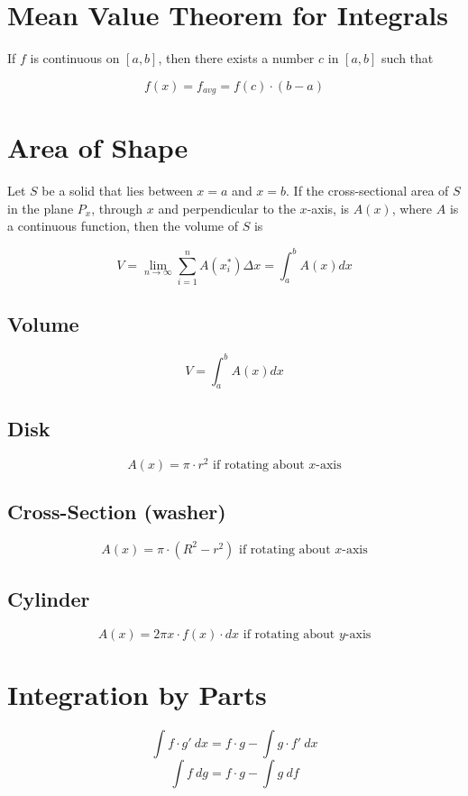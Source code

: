 \documentclass[12pt]{article}
\begin{document}
\section{Mean Value Theorem for Integrals} If $f$ is continuous on $[a,b]$, then there exists a number $c$ in $[a,b]$ such that 

$$f(x) = f_{avg} = f(c) \cdot (b-a)$$


\section{Area of Shape} Let $S$ be a solid that lies between $x=a$ and $x=b$. If the cross-sectional area of $S$ in the plane $P_x$, through $x$ and perpendicular to the $x$-axis, is $A(x)$, where $A$ is a continuous function, then the volume of $S$ is 

$$V=\lim_{n \to \infty} \sum_{i=1}^{n} A(x_i^*) \Delta x = \int_a^b A(x) dx$$

\subsection{Volume}

$$V=\int_a^b A(x) dx$$

\subsection{Disk}

$$A(x) = \pi \cdot r^2 \text{ if rotating about $x$-axis}$$

\subsection{Cross-Section (washer)}

$$A(x) = \pi \cdot (R^2 - r^2)  \text{ if rotating about $x$-axis}$$

\subsection{Cylinder}

$$A(x) = 2\pi x \cdot f(x) \cdot dx \text{ if rotating about $y$-axis}$$


\section{Integration by Parts}
$$\int f \cdot g'~dx = f \cdot g - \int g \cdot f'~dx$$
$$\int f~dg = f \cdot g - \int g~df$$
\end{document}
